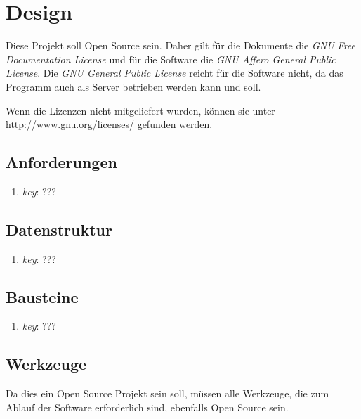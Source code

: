 \documentclass[english,ngerman,parskip=half,headsepline,footsepline]{scrreprt}
\begin{document}
	
	\chapter{Design}
	\thispagestyle{scrheadings}
	
	Diese Projekt soll Open Source sein. Daher gilt für die Dokumente die \emph{GNU Free Documentation License} und für die Software die \emph{GNU Affero General Public License}. Die \emph{GNU General Public License} reicht für die Software nicht, da das Programm auch als Server betrieben werden kann und soll.
	
	Wenn die Lizenzen nicht mitgeliefert wurden, können sie unter \url{http://www.gnu.org/licenses/} gefunden werden.
	
	\section{Anforderungen}
	\begin{enumerate}
		\item \label{Anforderung:key} \emph{key}: ???
	\end{enumerate}
	
	\section{Datenstruktur}
	\begin{enumerate}
		\item \label{Datenstruktur:key} \emph{key}: ???
	\end{enumerate}
	
	\section{Bausteine}
	\begin{enumerate}
		\item \label{Baustein:key} \emph{key}: ???
	\end{enumerate}
	
	\section{Werkzeuge}
	Da dies ein Open Source Projekt sein soll, müssen alle Werkzeuge, die zum Ablauf der Software erforderlich sind, ebenfalls Open Source sein.
	
\end{document}
